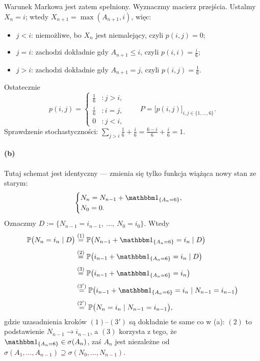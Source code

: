 \documentclass[dvipsnames]{book}
\begin{document}
Warunek Markowa jest zatem spełniony. Wyznaczmy macierz przejścia. Ustalmy
$X_n = i$; wtedy $X_{n+1} = \max(A_{n+1}, i)$, więc:
\begin{itemize}[topsep=2pt,itemsep=1pt]
  \item $j < i$: niemożliwe, bo $X_n$ jest niemalejący, czyli $p(i,j) = 0$;
  \item $j = i$: zachodzi dokładnie gdy $A_{n+1} \leq i$, czyli
  $p(i,i) = \tfrac{i}{6}$;
  \item $j > i$: zachodzi dokładnie gdy $A_{n+1} = j$, czyli
  $p(i,j) = \tfrac{1}{6}$.
\end{itemize}
Ostatecznie
\[
  p(i,j) =
  \begin{cases}
    \tfrac{1}{6} & \colon j > i, \\[1mm]
    \tfrac{i}{6} & \colon i = j, \\[1mm]
    0            & \colon j < i,
  \end{cases}
  \qquad
  P = \big[p(i,j)\big]_{i,j \in \{1,\ldots,6\}}.
\]
Sprawdzenie stochastyczności: $\sum_{j > i} \tfrac{1}{6} + \tfrac{i}{6}
= \tfrac{6-i}{6} + \tfrac{i}{6} = 1$. \checkmark

\paragraph{(b)} Tutaj schemat jest identyczny --- zmienia się tylko funkcja
wiążąca nowy stan ze starym:
\[
  \begin{cases}
    N_n = N_{n-1} + \ind_{\{A_n = 6\}}, \\
    N_0 = 0.
  \end{cases}
\]
Oznaczmy $D := \{N_{n-1} = i_{n-1},\ \ldots,\ N_0 = i_0\}$. Wtedy
\begin{align*}
  \P\big(N_n = i_n \mid D\big)
  &\overset{(1)}{=} \P\big(N_{n-1} + \ind_{\{A_n = 6\}} = i_n \mid D\big) \\[1mm]
  &\overset{(2)}{=} \P\big(i_{n-1} + \ind_{\{A_n = 6\}} = i_n \mid D\big) \\[1mm]
  &\overset{(3)}{=} \P\big(i_{n-1} + \ind_{\{A_n = 6\}} = i_n\big) \\[1mm]
  &\overset{(3')}{=} \P\big(i_{n-1} + \ind_{\{A_n = 6\}} = i_n \mid N_{n-1} = i_{n-1}\big) \\[1mm]
  &\overset{(2')}{=} \P\big(N_n = i_n \mid N_{n-1} = i_{n-1}\big),
\end{align*}
gdzie uzasadnienia kroków $(1)$--$(3')$ są dokładnie te same co w (a): $(2)$ to
podstawienie $N_{n-1} \to i_{n-1}$, a
$(3)$ korzysta z tego, że $\ind_{\{A_n = 6\}} \in \sigma(A_n)$, zaś $A_n$ jest
niezależne od $\sigma(A_1, \ldots, A_{n-1}) \supseteq \sigma(N_0, \ldots, N_{n-1})$.
\end{document}
